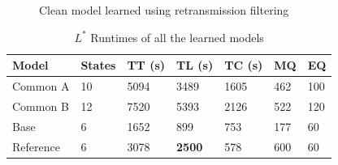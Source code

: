 \begin{figure}[ht]
	\vspace*{\fill}
	\noindent
	\hspace*{-2.1\oddsidemargin}%
	\caption{Clean model learned using retransmission filtering}
	\label{fig:reference}
	\vspace*{\fill}
\end{figure}

\begin{table}[h]
	\centering
	\begin{tabular}{|l|l|l|l|l|l|l|}
		\hline
		\rowcolor[HTML]{C0C0C0} 
		Model     & States & TT (s)   & TL (s)   & TC (s)   & MQ  & EQ  \\ \hline
		Common A  & 10     & 5094 & 3489 & 1605 & 462 & 100 \\ \hline
		Common B  & 12     & 7520 & 5393 & 2126 & 522 & 120 \\ \hline
		Base      & 6      & 1652 & 899  & 753  & 177 & 60  \\ \hline
		Reference & 6      & 3078 & \textbf{2500} & 578  & 600 & 60  \\ \hline
	\end{tabular}
	\caption{$L^*$ Runtimes of all the learned models}
	\label{tab:runtime_summary_lstar}
\end{table}
\newpage

